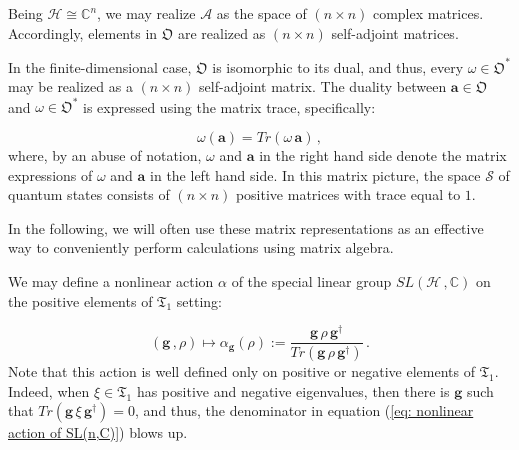 \documentclass[11pt]{article}
\newcommand{\be}{\begin{equation}}
\newcommand{\ee}{\end{equation}}
\newcommand{\appa}{\mathcal{A}}
\newcommand{\stsp}{\mathcal{S}}
\newcommand{\obsp}{\mathfrak{O}}
\begin{document}
Being  $\mathcal{H}\cong\mathbb{C}^{n}$, we may realize $\appa$ as the space of $(n\times n)$ complex matrices.
Accordingly, elements in $\obsp$ are realized as $(n\times n)$ self-adjoint matrices.
 
In the finite-dimensional case, $\obsp$ is isomorphic to its dual, and thus, every $\omega\in\obsp^{*}$ may  be realized as a $(n\times n)$  self-adjoint matrix.
The duality between $\mathbf{a}\in\obsp$ and $\omega\in\obsp^{*}$ is expressed using the matrix trace, specifically:

\be
\omega(\mathbf{a})=Tr(\omega\,\mathbf{a})\,,
\ee
where, by an abuse of notation, $\omega$ and $\mathbf{a}$ in the right hand side denote the matrix expressions of $\omega$ and $\mathbf{a}$ in the left hand side.
In this matrix picture, the space $\stsp$ of quantum states consists of $(n\times n)$ positive matrices with trace equal to $1$.


In the following, we will  often use these matrix representations as an effective way to conveniently perform calculations using matrix algebra.




We may define a nonlinear action $\alpha$ of the special linear group $SL(\mathcal{H}\,,\mathbb{C})$ on the positive elements of $\mathfrak{T}_{1}$ setting:

\be\label{eq: nonlinear action of SL(n,C)}
(\mathbf{g}\,,\rho)\mapsto \alpha_{\mathbf{g}}(\rho):=\frac{\mathbf{g}\,\rho\,\mathbf{g}^{\dagger}}{Tr(\mathbf{g}\,\rho\,\mathbf{g}^{\dagger})}\,.
\ee
Note that this action is well defined only on positive or negative elements of $\mathfrak{T}_{1}$.
Indeed, when $\xi\in\mathfrak{T}_{1}$ has positive and negative eigenvalues, then there is $\mathbf{g}$ such that $Tr(\mathbf{g}\,\xi\,\mathbf{g}^{\dagger})=0$, and thus, the denominator in equation (\ref{eq: nonlinear action of SL(n,C)}) blows up.
\end{document}
